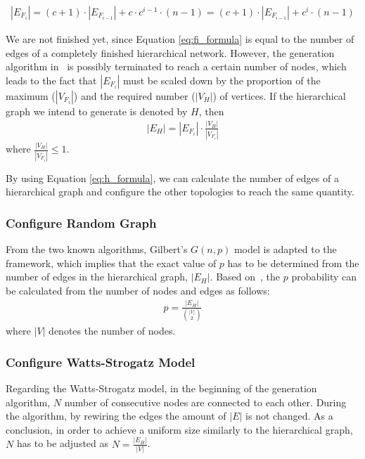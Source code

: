 \begin{align}\label{eq:fi_formula}
	|E_{F_i}| = (c+1) \cdot |E_{F_{i-1}}| + c \cdot c^{i-1} \cdot (n - 1)	= (c+1) \cdot |E_{F_{i-1}}| + c^i \cdot (n - 1)
\end{align}

We are not finished yet, since Equation \ref{eq:fi_formula} is equal to the number of edges of a completely finished hierarchical network. However, the generation algorithm in \framework~is possibly terminated to reach a certain number of nodes, which leads to the fact that $|E_{F_i}|$ must be scaled down by the proportion of the maximum ($|V_{F_i}|$) and the required number ($|V_H|$) of vertices. If the hierarchical graph we intend to generate is denoted by $H$, then
\begin{align}\label{eq:h_formula}
	|E_H| = |E_{F_i}| \cdot \frac{|V_H|}{|V_{F_i}|}
\end{align}
where $\frac{|V_H|}{|V_{F_i}|} \leq 1$.

By using Equation \ref{eq:h_formula}, we can calculate the number of edges of a hierarchical graph and configure the other topologies to reach the same quantity.

\subsubsection{Configure Random Graph}
From the two known algorithms, Gilbert's $G(n,p)$ model is adapted to the framework, which implies that the exact value of $p$ has to be determined from the number of edges in the hierarchical graph, $|E_H|$. Based on~\cite{random_p}, the $p$ probability can be calculated from the number of nodes and edges as follows:
\begin{align}
	p = \frac{|E_H|}{\binom{|V|}{2}}
\end{align}
where $|V|$ denotes the number of nodes.

\subsubsection{Configure Watts-Strogatz Model}\label{sec:watts_generation}

Regarding the Watts-Strogatz model, in the beginning of the generation algorithm, $N$ number of consecutive nodes are connected to each other. During the algorithm, by rewiring the edges the amount of $|E|$ is not changed. As a conclusion, in order to achieve a uniform size similarly to the hierarchical graph, $N$ has to be adjusted as $N = \frac{|E_H|}{|V|}$.

